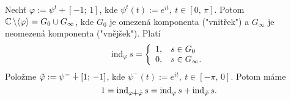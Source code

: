 \begin{example}
Nechť $\varphi:=\psi^t+[-1;\,1]$, kde $\psi^t(t):=e^{it},\ t\in[0,\,\pi]$. Potom $\operatorname{\mathbb{C}} \backslash\langle{\varphi}\rangle=G_0\cup{G_\infty}$, kde $G_0$ je omezená komponenta ("vnitřek") a $G_\infty$ je neomezená komponenta ("vnějšek"). Platí
$$\operatorname{ind}_\varphi{s}=
\left\{
\begin{array}{ll}
1, \hspace{3mm} s\in{G_0}\\
0, \hspace{3mm} s\in{G_\infty}.
\end{array}
\right.$$
Položme $\Tilde{\varphi}:=\psi^-\dotplus[1;\,-1]$,
kde $\psi^-(t):=e^{it},\ t\in[-\pi,\,0]$. Potom máme 
$$1=\operatorname{ind}_{\varphi\dotplus\tilde\varphi}{s}=\operatorname{ind}_\varphi{s}+\operatorname{ind}_{\tilde{\varphi}}{s}.$$
\end{example}

